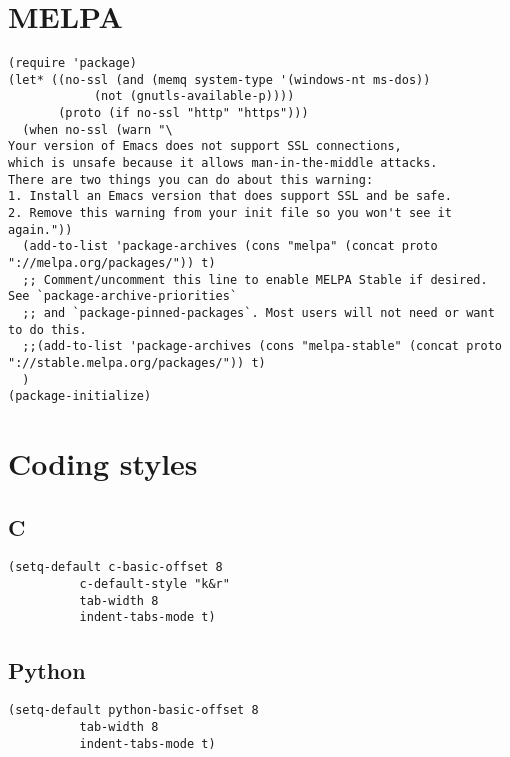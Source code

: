 \documentclass[11pt]{article}
\author{Sandy}
\date{\today}
\title{}
\begin{document}
\tableofcontents


\section{MELPA}
\label{sec:org97672bc}
\begin{verbatim}
(require 'package)
(let* ((no-ssl (and (memq system-type '(windows-nt ms-dos))
		    (not (gnutls-available-p))))
       (proto (if no-ssl "http" "https")))
  (when no-ssl (warn "\
Your version of Emacs does not support SSL connections,
which is unsafe because it allows man-in-the-middle attacks.
There are two things you can do about this warning:
1. Install an Emacs version that does support SSL and be safe.
2. Remove this warning from your init file so you won't see it again."))
  (add-to-list 'package-archives (cons "melpa" (concat proto "://melpa.org/packages/")) t)
  ;; Comment/uncomment this line to enable MELPA Stable if desired.  See `package-archive-priorities`
  ;; and `package-pinned-packages`. Most users will not need or want to do this.
  ;;(add-to-list 'package-archives (cons "melpa-stable" (concat proto "://stable.melpa.org/packages/")) t)
  )
(package-initialize)
\end{verbatim}
\section{Coding styles}
\label{sec:orge028dfa}
\subsection{C}
\label{sec:orga580f2b}

\begin{verbatim}
(setq-default c-basic-offset 8
	      c-default-style "k&r"
	      tab-width 8
	      indent-tabs-mode t)
\end{verbatim}
\subsection{Python}
\label{sec:org050f709}
\begin{verbatim}
(setq-default python-basic-offset 8
	      tab-width 8
	      indent-tabs-mode t)
\end{verbatim}
\end{document}
